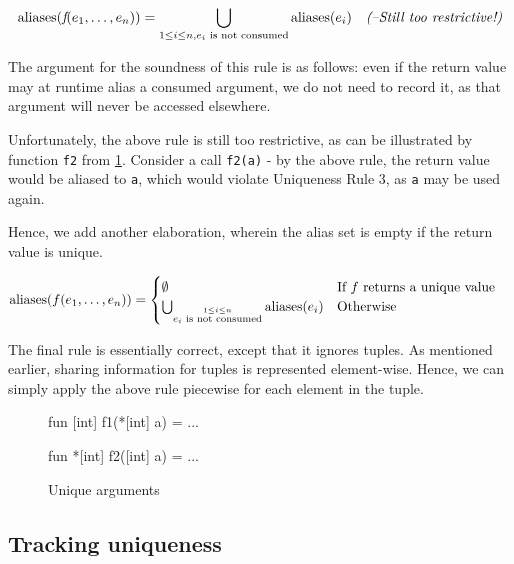 \begin{align*}
  \textrm{aliases}(\textit{f}(e_{1}, \ldots, e_{n})) &= \bigcup_{1 \leq i \leq n, \text{$e_{i}$ is not consumed}} \textrm{aliases}(e_{i})  & \textit{(--Still too restrictive!)}
\end{align*}

The argument for the soundness of this rule is as follows: even if the
return value may at runtime alias a consumed argument, we do not need
to record it, as that argument will never be accessed elsewhere.

Unfortunately, the above rule is still too restrictive, as can be
illustrated by function \texttt{f2} from \ref{fig:unique-arguments}.
Consider a call \texttt{f2(a)} - by the above rule, the return value
would be aliased to \texttt{a}, which would violate Uniqueness
Rule 3, as \texttt{a} may be used again.

Hence, we add another elaboration, wherein the alias set is empty if
the return value is unique.

\begin{align*}
  \textrm{aliases}(f(e_{1}, \ldots, e_{n})) &=
  \begin{cases}
    \emptyset & \mbox{If $f$ returns a unique value}\\
    \bigcup_{\overset{1 \leq i \leq n}{\text{$e_{i}$ is not consumed}}} \textrm{aliases}(e_{i}) & \mbox{Otherwise}
  \end{cases}
\end{align*}

The final rule is essentially correct, except that it ignores tuples.
As mentioned earlier, sharing information for tuples is represented
element-wise.  Hence, we can simply apply the above rule piecewise for
each element in the tuple.

\begin{figure}
\begin{center}
\begin{bcolorcode}
fun [int] f1(*[int] a) = ...

fun *[int] f2([int] a) = ...
\end{bcolorcode}
\end{center}
\caption{Unique arguments}
\label{fig:unique-arguments}
\end{figure}

\subsection{Tracking uniqueness}
\label{subsec:l0-tracking-uniqueness}

